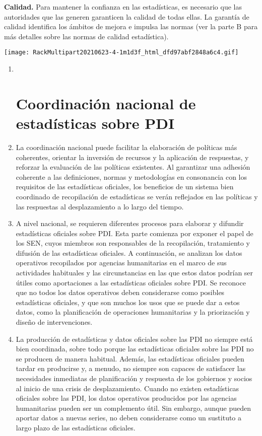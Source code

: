 \documentclass[
]{book}
\begin{document}
\textbf{Calidad.} Para mantener la confianza en las estadísticas, es necesario que las autoridades que las generen garanticen la calidad de todas ellas. La garantía de calidad identifica los ámbitos de mejora e impulsa las normas (ver la parte B para más detalles sobre las normas de calidad estadística).

\texttt{[image: RackMultipart20210623-4-1m1d3f\_html\_dfd97abf2848a6c4.gif]}

\begin{enumerate}
\def\labelenumi{\arabic{enumi}.}
\item ~
  \hypertarget{coordinaciuxf3n-nacional-de-estaduxedsticas-sobre-pdi}{%
  \section{Coordinación nacional de estadísticas sobre PDI}\label{coordinaciuxf3n-nacional-de-estaduxedsticas-sobre-pdi}}
\item
  La coordinación nacional puede facilitar la elaboración de políticas más coherentes, orientar la inversión de recursos y la aplicación de respuestas, y reforzar la evaluación de las políticas existentes. Al garantizar una adhesión coherente a las definiciones, normas y metodologías en consonancia con los requisitos de las estadísticas oficiales, los beneficios de un sistema bien coordinado de recopilación de estadísticas se verán reflejados en las políticas y las respuestas al desplazamiento a lo largo del tiempo.
\item
  A nivel nacional, se requieren diferentes procesos para elaborar y difundir estadísticas oficiales sobre PDI. Esta parte comienza por exponer el papel de los SEN, cuyos miembros son responsables de la recopilación, tratamiento y difusión de las estadísticas oficiales. A continuación, se analizan los datos operativos recopilados por agencias humanitarias en el marco de sus actividades habituales y las circunstancias en las que estos datos podrían ser útiles como aportaciones a las estadísticas oficiales sobre PDI. Se reconoce que no todos los datos operativos deben considerarse como posibles estadísticas oficiales, y que son muchos los usos que se puede dar a estos datos, como la planificación de operaciones humanitarias y la priorización y diseño de intervenciones.
\item
  La producción de estadísticas y datos oficiales sobre las PDI no siempre está bien coordinada, sobre todo porque las estadísticas oficiales sobre las PDI no se producen de manera habitual. Además, las estadísticas oficiales pueden tardar en producirse y, a menudo, no siempre son capaces de satisfacer las necesidades inmediatas de planificación y respuesta de los gobiernos y socios al inicio de una crisis de desplazamiento. Cuando no existen estadísticas oficiales sobre las PDI, los datos operativos producidos por las agencias humanitarias pueden ser un complemento útil. Sin embargo, aunque pueden aportar datos a nuevas series, no deben considerarse como un sustituto a largo plazo de las estadísticas oficiales.


\end{enumerate}
\end{document}

